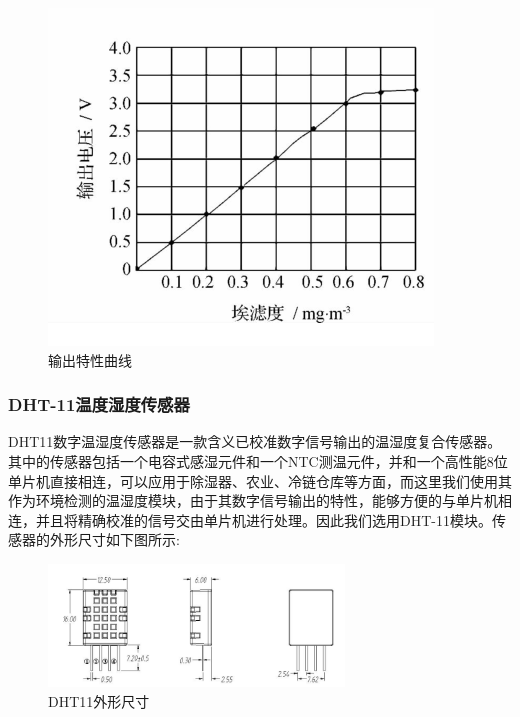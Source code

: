 \documentclass[a4paper, 11pt]{article} %
\begin{document}
\begin{figure}[H]
  \centering
  \includegraphics[scale = 0.65 ]{1-6.png}
  \caption{输出特性曲线}
  \label{img7} 
\end{figure}



\subsubsection{DHT-11温度湿度传感器}
\par{} DHT11数字温湿度传感器是一款含义已校准数字信号输出的温湿度复合传感器。其中的传感器包括一个电容式感湿元件和一个NTC测温元件，并和一个高性能8位单片机直接相连，可以应用于除湿器、农业、冷链仓库等方面，而这里我们使用其作为环境检测的温湿度模块，由于其数字信号输出的特性，能够方便的与单片机相连，并且将精确校准的信号交由单片机进行处理。因此我们选用DHT-11模块。传感器的外形尺寸如下图所示:
\begin{figure}[H]
  \centering
  \includegraphics[width = 0.7\textwidth]{1-7.png}
  \caption{DHT11外形尺寸}
  \label{img8} 
\end{figure}
\end{document}
